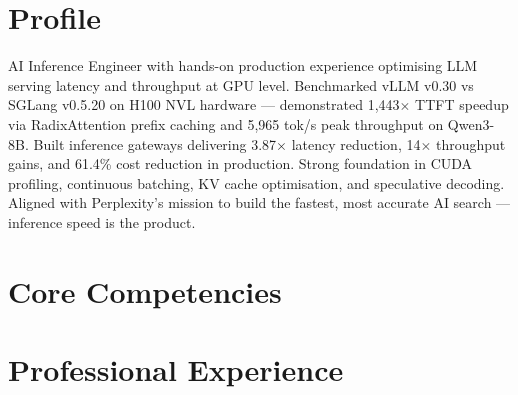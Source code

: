 \documentclass[11pt,a4paper]{moderncv}
\begin{document}
\makecvtitle

\section{Profile}
AI Inference Engineer with hands-on production experience optimising LLM serving latency and throughput at GPU level. Benchmarked vLLM v0.30 vs SGLang v0.5.20 on H100 NVL hardware — demonstrated 1,443$\times$ TTFT speedup via RadixAttention prefix caching and 5,965 tok/s peak throughput on Qwen3-8B. Built inference gateways delivering 3.87$\times$ latency reduction, 14$\times$ throughput gains, and 61.4\% cost reduction in production. Strong foundation in CUDA profiling, continuous batching, KV cache optimisation, and speculative decoding. Aligned with Perplexity's mission to build the fastest, most accurate AI search — inference speed is the product.

\section{Core Competencies}

\section{Professional Experience}
\end{document}

